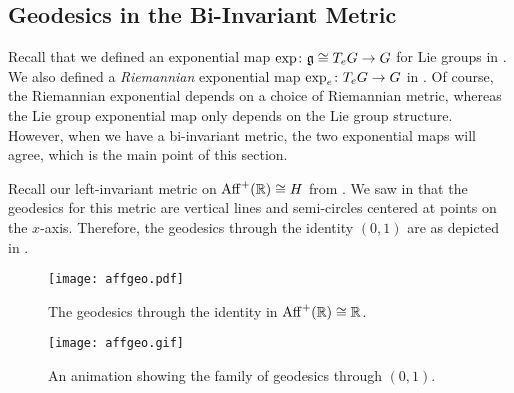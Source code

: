 \subsection{Geodesics in the Bi-Invariant Metric}

Recall that we defined an exponential map $\exp \colon\thinspace\! \mathfrak{g} \cong T_e G \to G$ for Lie groups in . We also defined a \emph{Riemannian} exponential map $\exp_e \colon\thinspace\! T_e G \to G$ in . Of course, the Riemannian exponential depends on a choice of Riemannian metric, whereas the Lie group exponential map only depends on the Lie group structure. However, when we have a bi-invariant metric, the two exponential maps will agree, which is the main point of this section.

\begin{example}
	Recall our left-invariant metric on $\operatorname{Aff}^+(\mathbb{R}) \cong H$ from . We saw in  that the geodesics for this metric are vertical lines and semi-circles centered at points on the $x$-axis. Therefore, the geodesics through the identity $(0,1)$ are as depicted in .
	
	\begin{figure}[htbp]
		\centering
			\texttt{[image: affgeo.pdf]}
		\caption{The geodesics through the identity in $\operatorname{Aff}^+(\mathbb{R}) \cong \mathbb{R}$.}
		\label{fig:identity geodesics in aff}
	\end{figure}

	\ifplastex
	\begin{figure}[htbp]
		\centering
			\texttt{[image: affgeo.gif]}
		\caption{An animation showing the family of geodesics through $(0,1)$.}
		\label{fig:identity geodesics in aff animation}
	\end{figure}
	\fi
	

\end{example}
